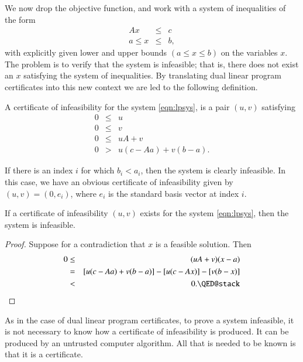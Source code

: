 We now drop the objective function, and work
with a system of inequalities  of the form
\begin{eqnarray}
\label{eqn:lpsys}
A x &\le& c\\
a \le x    &\le& b,
\end{eqnarray}
with explicitly given lower and upper bounds $(a\le x\le b)$ on
the variables $x$.  The problem
is to verify that the system is infeasible; that is, there does
not exist an $x$ satisfying the system of inequalities.  By
translating dual linear program certificates into this new context
we are led to the following definition.

\begin{definition}
A certificate of infeasibility for the system \ref{eqn:lpsys},
is a pair $(u,v)$ satisfying
\begin{eqnarray*}
0&\le& u\\
0&\le& v\\
0&\le& u A + v\\
0& >& u(c-Aa) + v(b-a).
\end{eqnarray*}
\end{definition}

\begin{example}
If there is an index $i$ for which $b_i < a_i$, then the system is
clearly infeasible.  In this case, we have an obvious certificate
of infeasibility given by $(u,v)=(0,e_i)$, where $e_i$ is the
standard basis vector at index $i$.
\end{example}

\begin{lemma}
If a certificate of infeasibility $(u,v)$ exists for the system
\ref{eqn:lpsys}, then the system is infeasible.
\end{lemma}

\begin{proof}
Suppose for a contradiction that $x$ is a feasible solution.
Then
\begin{eqnarray*}
0 &\le& (u A + v)(x-a) \\
&=& [u (c- A a) + v (b- a)] - [u (c - A x)] - [v (b - x)]\\
&<& 0.\qedhere
\end{eqnarray*}
\end{proof}


As in the case of dual linear program certificates, 
to prove a system infeasible, it is not necessary to know how a
certificate of infeasibility is produced.  It can be produced 
by an untrusted computer algorithm.  All that is needed
to be known is that it is a certificate.

